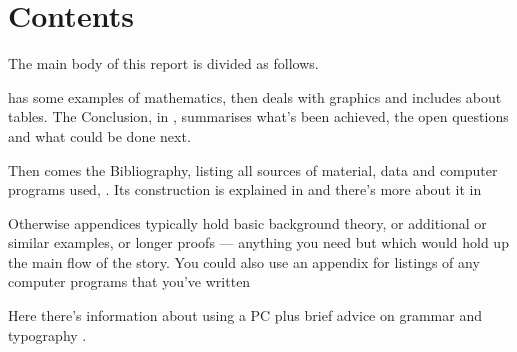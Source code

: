 \section{Contents}\label{intro:contents}
The main body of this report is divided as follows.
\par
 has some examples of mathematics, then
 deals with graphics and includes
about tables. The Conclusion, in
, summarises what's been achieved, the open
questions and what could be done next.
\par
Then comes the Bibliography, listing all sources of material, data and
computer programs used, \etc. Its construction is explained in
 and there's more about it in 
\par
Otherwise appendices typically hold basic background theory, or
additional or similar examples, or longer proofs 
 --- anything you need but which would hold up the main flow of the
story. You could also use an appendix for listings of any computer
programs that you've written 
\par
Here there's information about using a PC  plus
brief advice on grammar and typography .
%
